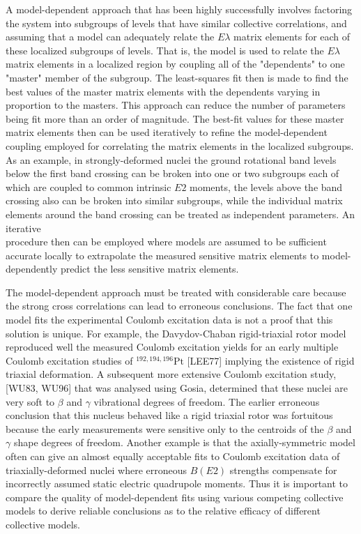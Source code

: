 \documentclass[10pt]{article}
\begin{document}
A model-dependent approach that has been highly successfully involves factoring the system into subgroups of levels that have similar collective correlations, and assuming that a model can adequately relate the $E \lambda$ matrix elements for each of these localized subgroups of levels. That is, the model is used to relate the $E \lambda$ matrix elements in a localized region by coupling all of the "dependents" to one "master" member of the subgroup. The least-squares fit then is made to find the best values of the master matrix elements with the dependents varying in proportion to the masters. This approach can reduce the number of parameters being fit more than an order of magnitude. The best-fit values for these master matrix elements then can be used iteratively to refine the model-dependent coupling employed for correlating the matrix elements in the localized subgroups. As an example, in strongly-deformed nuclei the ground rotational band levels below the first band crossing can be broken into one or two subgroups each of which are coupled to common intrinsic $E 2$ moments, the levels above the band crossing also can be broken into similar subgroups, while the individual matrix elements around the band crossing can be treated as independent parameters. An iterative\\
procedure then can be employed where models are assumed to be sufficient accurate locally to extrapolate the measured sensitive matrix elements to model-dependently predict the less sensitive matrix elements.

The model-dependent approach must be treated with considerable care because the strong cross correlations can lead to erroneous conclusions. The fact that one model fits the experimental Coulomb excitation data is not a proof that this solution is unique. For example, the Davydov-Chaban rigid-triaxial rotor model reproduced well the measured Coulomb excitation yields for an early multiple Coulomb excitation studies of ${ }^{192,194,196} \mathrm{Pt}$ [LEE77] implying the existence of rigid triaxial deformation. A subsequent more extensive Coulomb excitation study,[WU83, WU96] that was analysed using Gosia, determined that these nuclei are very soft to $\beta$ and $\gamma$ vibrational degrees of freedom. The earlier erroneous conclusion that this nucleus behaved like a rigid triaxial rotor was fortuitous because the early measurements were sensitive only to the centroids of the $\beta$ and $\gamma$ shape degrees of freedom. Another example is that the axially-symmetric model often can give an almost equally acceptable fits to Coulomb excitation data of triaxially-deformed nuclei where erroneous $B(E 2)$ strengths compensate for incorrectly assumed static electric quadrupole moments. Thus it is important to compare the quality of model-dependent fits using various competing collective models to derive reliable conclusions as to the relative efficacy of different collective models.
\end{document}
